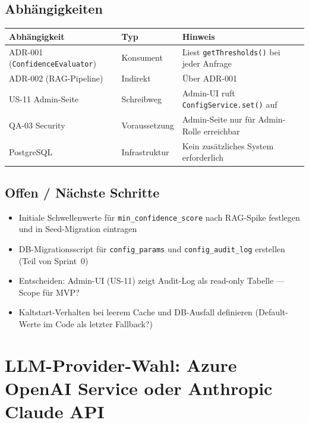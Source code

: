 \documentclass[a4paper, 11pt, oneside]{report}
\newcommand{\code}[1]{\texttt{\small #1}}
\newcommand{\todo}{$\square$\;}
\begin{document}
\section{Abhängigkeiten}

\begin{table}[htb]
\small\centering
\begin{tabularx}{\linewidth}{L{4cm} L{3cm} X}
\toprule
{}
\textbf{Abhängigkeit} & \textbf{Typ} & \textbf{Hinweis} \\
\midrule
ADR-001 (\code{ConfidenceEvaluator}) & Konsument    & Liest \code{getThresholds()} bei jeder Anfrage \\
ADR-002 (RAG-Pipeline)               & Indirekt     & Über ADR-001 \\
US-11 Admin-Seite                    & Schreibweg   & Admin-UI ruft \code{ConfigService.set()} auf \\
QA-03 Security                       & Voraussetzung & Admin-Seite nur für Admin-Rolle erreichbar \\
PostgreSQL                           & Infrastruktur & Kein zusätzliches System erforderlich \\
\bottomrule
\end{tabularx}
\end{table}

\section{Offen / Nächste Schritte}

\begin{itemize}[label=\todo]
  \item Initiale Schwellenwerte für \code{min\_confidence\_score} nach
        RAG-Spike festlegen und in Seed-Migration eintragen
  \item DB-Migrationsscript für \code{config\_params} und
        \code{config\_audit\_log} erstellen (Teil von Sprint~0)
  \item Entscheiden: Admin-UI (US-11) zeigt Audit-Log als read-only Tabelle --- Scope für MVP?
  \item Kaltstart-Verhalten bei leerem Cache und DB-Ausfall definieren
        (Default-Werte im Code als letzter Fallback?)
\end{itemize}

\chapter{LLM-Provider-Wahl: Azure OpenAI Service oder Anthropic Claude API}
\label{chap:adr004}
\end{document}
